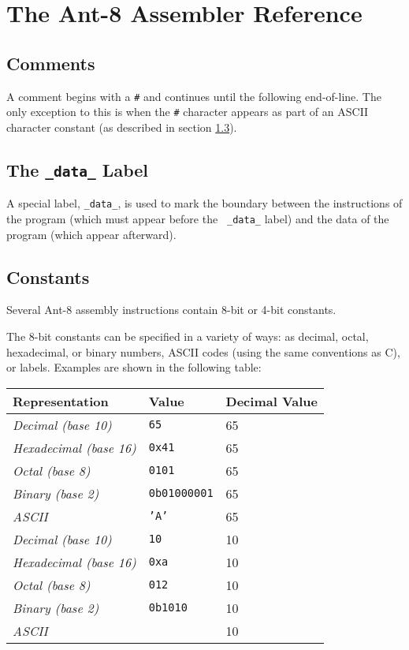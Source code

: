 
\section{The Ant-8 Assembler Reference}

\subsection{Comments}

A comment begins with a \verb$#$ and continues until the following
end-of-line.  The only exception to this is when the \verb$#$ character
appears as part of an ASCII character constant (as described in
section \ref{data-const-sec}).

\subsection{The {\tt \_data\_} Label}

A special label, {\tt \_data\_}, is used to mark the boundary between
the instructions of the program (which must appear before the {\tt
\_data\_} label) and the data of the program (which appear afterward).

\subsection{Constants}
\label{data-const-sec}

Several Ant-8 assembly instructions contain 8-bit or 4-bit constants.

The 8-bit constants can be specified in a variety of ways:
as decimal, octal, hexadecimal, or binary numbers, {\sc ASCII} codes (using
the same conventions as C), or labels.  Examples are shown in the
following table:

\begin{center}
\begin{tabular}{|l|l|l|}
\hline
Representation	& Value	& Decimal Value \\
\hline
{\em Decimal (base 10)}		&	{\tt 65}	&	65 \\
{\em Hexadecimal (base 16)}	&	{\tt 0x41}	&	65 \\
{\em Octal (base 8)}		&	{\tt 0101}	&	65 \\
{\em Binary (base 2)}		&	{\tt 0b01000001}&	65 \\
{\em {\sc ASCII}}		&	{\tt 'A'}	&	65 \\
\hline
{\em Decimal (base 10)}		&	{\tt 10}	&	10 \\
{\em Hexadecimal (base 16)}	&	{\tt 0xa}	&	10 \\
{\em Octal (base 8)}		&	{\tt 012}	&	10 \\
{\em Binary (base 2)}		&	{\tt 0b1010}	&	10 \\
{\em {\sc ASCII}}		&	{\tt '\verb$\$n'}	&	10 \\
\hline
\end{tabular}
\end{center}
\vspace{3mm}

